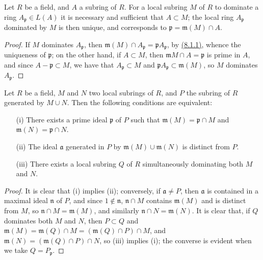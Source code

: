 \begin{lem}[8.1.3]
\label{lem-1.8.1.3}
Let $R$ be a field, and $A$ a subring of $R$. For a
local subring $M$ of $R$ to dominate a ring $A_\mathfrak{p}\in L(A)$ it is
necessary and sufficient that $A\subset M$; the local ring $A_\mathfrak{p}$
dominated by $M$ is then unique, and corresponds to
$\mathfrak{p}=\mathfrak{m}(M)\cap A$.
\end{lem}

\begin{proof}
\label{proof-lem-1.8.1.3}
If $M$ dominates $A_\mathfrak{p}$, then
$\mathfrak{m}(M)\cap A_\mathfrak{p}=\mathfrak{p}A_\mathfrak{p}$,
by \hyperref[lem-1.8.1.1]{(8.1.1)}, whence the uniqueness of $\mathfrak{p}$; on the other hand,
if $A\subset M$, then $\mathfrak{m}M\cap A=\mathfrak{p}$ is prime in $A$, and since
$A-\mathfrak{p}\subset M$, we have that $A_\mathfrak{p}\subset M$ and
$\mathfrak{p}A_\mathfrak{p}\subset\mathfrak{m}(M)$, so $M$ dominates
$A_\mathfrak{p}$.
\end{proof}

\begin{lem}[8.1.4]
\label{lem-1.8.1.4}
Let $R$ be a field, $M$ and $N$ two local
subrings of $R$, and $P$ the subring of $R$ generated by $M\cup N$. Then the
following conditions are equivalent:
\begin{itemize}
  \item[{\rm(i)}] There exists a prime ideal $\mathfrak{p}$ of $P$ such that
        $\mathfrak{m}(M)=\mathfrak{p}\cap M$ and $\mathfrak{m}(N)=\mathfrak{p}\cap N$.
  \item[{\rm(ii)}] The ideal $\mathfrak{a}$ generated in $P$ by $\mathfrak{m}(M)\cup\mathfrak{m}(N)$ is
        distinct from $P$.
  \item[{\rm(iii)}] There exists a local subring $Q$ of $R$ simultaneously dominating both $M$ and $N$.
\end{itemize}
\end{lem}

\begin{proof}
\label{proof-lem-1.8.1.4}
It is clear that (i) implies (ii); conversely, if $\mathfrak{a}\neq P$, then
$\mathfrak{a}$ is contained in a maximal ideal $\mathfrak{n}$ of $P$, and since
$1\not\in\mathfrak{n}$, $\mathfrak{n}\cap M$ contains $\mathfrak{m}(M)$ and is
distinct from $M$, so $\mathfrak{n}\cap M=\mathfrak{m}(M)$, and similarly
$\mathfrak{n}\cap N=\mathfrak{m}(N)$. It is clear that, if $Q$ dominates both
$M$ and $N$, then $P\subset Q$ and
$\mathfrak{m}(M)=\mathfrak{m}(Q)\cap M=(\mathfrak{m}(Q)\cap P)\cap M$, and
$\mathfrak{m}(N)=(\mathfrak{m}(Q)\cap P)\cap N$, so (iii) implies (i); the converse
is evident when we take $Q=P_\mathfrak{p}$.
\end{proof}

